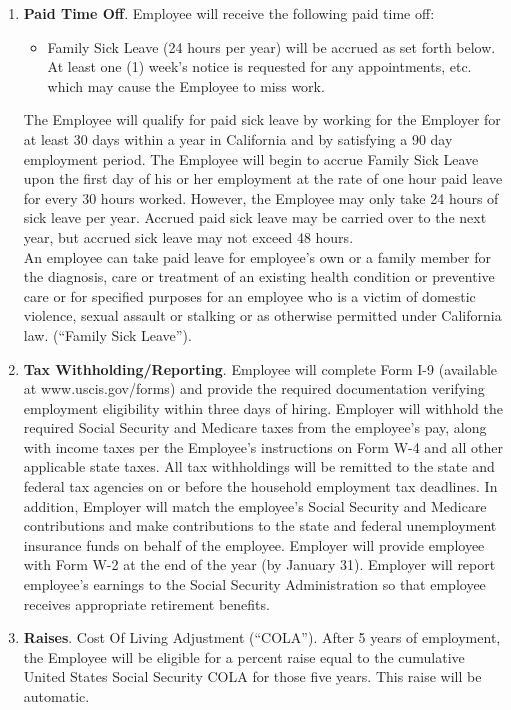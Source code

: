 \documentclass[]{article}
\begin{document}
\begin{enumerate}
	\item{\textbf{Paid Time Off}}. Employee will receive the following paid time off:
		\begin{itemize}
			\item Family Sick Leave (24 hours per year) will be accrued as set forth below. At least one (1) week's notice is requested for any appointments, etc. which may cause the Employee to miss work.
		\end{itemize}
		The Employee will qualify for paid sick leave by working for the Employer for at least 30 days within a year in California and by satisfying a 90 day employment period. The Employee will begin to accrue Family Sick Leave upon the first day of his or her employment at the rate of one hour paid leave for every 30 hours worked. However, the Employee may only take 24 hours of sick leave per year. Accrued paid sick leave may be carried over to the next year, but accrued sick leave may not exceed 48 hours.\\
	An employee can take paid leave for employee's own or a family member for the diagnosis, care or treatment of an existing health condition or preventive care or for specified purposes for an employee who is a victim of domestic violence, sexual assault or stalking or as otherwise permitted under California law. (``Family Sick Leave'').
	\item{\textbf{Tax Withholding/Reporting}}. Employee will complete Form I-9 (available at www.uscis.gov/forms) and provide the required documentation verifying employment eligibility within three days of hiring. Employer will withhold the required Social Security and Medicare taxes from the employee's pay, along with income taxes per the Employee's instructions on Form W-4 and all other applicable state taxes. All tax withholdings will be remitted to the state and federal tax agencies on or before the household employment tax deadlines. In addition, Employer will match the employee's Social Security and Medicare contributions and make contributions to the state and federal unemployment insurance funds on behalf of the employee. Employer will provide employee with Form W-2 at the end of the year (by January 31). Employer will report employee's earnings to the Social Security Administration so that employee receives appropriate retirement benefits.
	\item{\textbf{Raises}}. Cost Of Living Adjustment (``COLA''). After 5 years of employment, the Employee will be eligible for a percent raise equal to the cumulative United States Social Security COLA for those five years. This raise will be automatic.
\end{enumerate}
\end{document}
